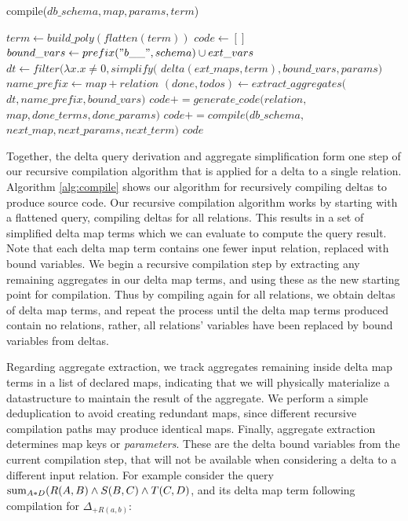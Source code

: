 \newcommand{\indentcode}{\hspace{5mm}}
\begin{algorithm}[htbp]
\caption{compile($db\_schema, map, params, term$)}
\label{alg:compile}
\begin{algorithmic}[1]
  \STATE {}
  \STATE $term \leftarrow build\_poly(flatten(term))$
\ENDIF
\STATE $code \leftarrow []$
  \STATE {}
  \STATE $bound\_vars \leftarrow prefix("b\_\_", schema) \cup ext\_vars$
  \STATE $dt \leftarrow filter(\lambda x. x \neq 0, simplify($
    \STATE \indentcode $delta(ext\_maps,term),bound\_vars, params)$
  \STATE $name\_prefix \leftarrow map+relation$
  \STATE $(done, todos) \leftarrow extract\_aggregates($
    \STATE \indentcode $dt, name\_prefix, bound\_vars)$
     \STATE $code += generate\_code(relation,$
     \STATE \indentcode $map, done\_terms, done\_params)$
  \ENDFOR
  \STATE {}
  \STATE $code += compile(db\_schema, $
  \STATE \indentcode $next\_map, next\_params, next\_term)$
  \ENDFOR
\ENDFOR
\RETURN $code$
\end{algorithmic}
\end{algorithm}


Together, the delta query derivation and aggregate simplification form one step
of our recursive compilation algorithm that is applied for a delta to a single
relation. 
Algorithm \ref{alg:compile} shows our algorithm for recursively compiling deltas
to produce source code. Our recursive compilation algorithm works by starting
with a flattened query, compiling deltas for all relations. This results in a
set of simplified delta map terms which we can evaluate to compute the query
result. Note that each delta map term contains one fewer input relation,
replaced with bound variables. We begin a recursive compilation step by
extracting any remaining aggregates in our delta map terms, and using these as
the new starting point for compilation. Thus by compiling again for all
relations, we obtain deltas of delta map terms, and repeat the process until the
delta map terms produced contain no relations, rather, all relations' variables
have been replaced by bound variables from deltas.

Regarding aggregate extraction, we track aggregates remaining inside delta map
terms in a list of declared maps, indicating that we will physically materialize
a datastructure to maintain the result of the aggregate. We perform a simple
deduplication to avoid creating redundant maps, since different recursive
compilation paths may produce identical maps. Finally, aggregate extraction
determines map keys or \textit{parameters}. These are the delta bound variables
from the current compilation step, that will not be available when considering a
delta to a different input relation. For example consider the query
$\mathrm{sum}_{A*D}(R(A,B) \wedge S(B,C) \wedge T(C,D)$, and its delta map term
following compilation for $\Delta_{+R(a,b)}$:

